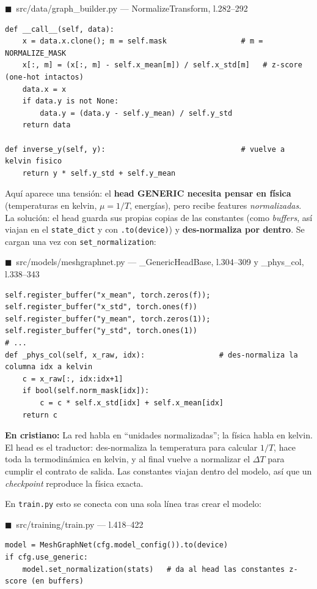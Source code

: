 \documentclass[11pt]{article}
\theoremstyle{definition}
\theoremstyle{plain}
\newcommand{\dummies}[1]{%
  \par\smallskip\noindent
  \colorbox{yellow!18}{\parbox{\dimexpr\linewidth-2\fboxsep}{%
  \small\textbf{En cristiano:} #1}}\par\smallskip}
\newcommand{\srcref}[1]{\par\smallskip\noindent
  {\footnotesize\ttfamily\textcolor{srcblue}{$\blacksquare$\ #1}}\par\vspace{1pt}}
\begin{document}
\srcref{src/data/graph\_builder.py — NormalizeTransform, l.282--292}
\begin{lstlisting}
def __call__(self, data):
    x = data.x.clone(); m = self.mask                 # m = NORMALIZE_MASK
    x[:, m] = (x[:, m] - self.x_mean[m]) / self.x_std[m]   # z-score (one-hot intactos)
    data.x = x
    if data.y is not None:
        data.y = (data.y - self.y_mean) / self.y_std
    return data

def inverse_y(self, y):                               # vuelve a kelvin fisico
    return y * self.y_std + self.y_mean
\end{lstlisting}

Aquí aparece una tensión: el \textbf{head GENERIC necesita pensar en física}
(temperaturas en kelvin, $\mu=1/T$, energías), pero recibe features
\emph{normalizadas}. La solución: el head guarda sus propias copias de las
constantes (como \emph{buffers}, así viajan en el \texttt{state\_dict} y con
\texttt{.to(device)}) y \textbf{des-normaliza por dentro}. Se cargan una vez con
\texttt{set\_normalization}:

\srcref{src/models/meshgraphnet.py — \_GenericHeadBase, l.304--309 y \_phys\_col, l.338--343}
\begin{lstlisting}
self.register_buffer("x_mean", torch.zeros(f)); self.register_buffer("x_std", torch.ones(f))
self.register_buffer("y_mean", torch.zeros(1)); self.register_buffer("y_std", torch.ones(1))
# ...
def _phys_col(self, x_raw, idx):                 # des-normaliza la columna idx a kelvin
    c = x_raw[:, idx:idx+1]
    if bool(self.norm_mask[idx]):
        c = c * self.x_std[idx] + self.x_mean[idx]
    return c
\end{lstlisting}

\dummies{La red habla en ``unidades normalizadas''; la física habla en kelvin. El
head es el traductor: des-normaliza la temperatura para calcular $1/T$, hace toda la
termodinámica en kelvin, y al final vuelve a normalizar el $\Delta T$ para cumplir el
contrato de salida. Las constantes viajan dentro del modelo, así que un
\emph{checkpoint} reproduce la física exacta.}

En \texttt{train.py} esto se conecta con una sola línea tras crear el modelo:

\srcref{src/training/train.py — l.418--422}
\begin{lstlisting}
model = MeshGraphNet(cfg.model_config()).to(device)
if cfg.use_generic:
    model.set_normalization(stats)   # da al head las constantes z-score (en buffers)
\end{lstlisting}
\end{document}
